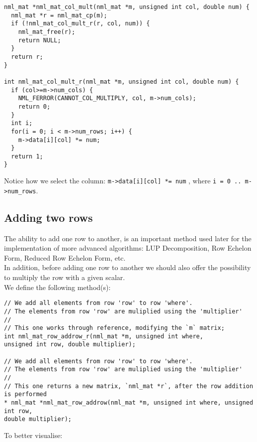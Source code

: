 \begin{verbatim}
nml_mat *nml_mat_col_mult(nml_mat *m, unsigned int col, double num) {
  nml_mat *r = nml_mat_cp(m);
  if (!nml_mat_col_mult_r(r, col, num)) {
    nml_mat_free(r);
    return NULL;
  }
  return r;
}

int nml_mat_col_mult_r(nml_mat *m, unsigned int col, double num) {
  if (col>=m->num_cols) {
    NML_FERROR(CANNOT_COL_MULTIPLY, col, m->num_cols);
    return 0;
  }
  int i;
  for(i = 0; i < m->num_rows; i++) {
    m->data[i][col] *= num;
  }
  return 1;
}
\end{verbatim}

Notice how we select the column: {\tt m->data[i][col] *= num} , where {\tt i = 0 .. m->num\_rows}.

\subsection{Adding two rows}

The ability to add one row to another, is an important method used later for the implementation of more advanced algorithms: LUP Decomposition, Row Echelon Form, Reduced Row Echelon Form, etc.
\\

In addition, before adding one row to another we should also offer the possibility to multiply the row with a given scalar.
\\

We define the following method(s):

\begin{verbatim}
// We add all elements from row 'row' to row 'where'. 
// The elements from row 'row' are muliplied using the 'multiplier'
//
// This one works through reference, modifying the `m` matrix; 
int nml_mat_row_addrow_r(nml_mat *m, unsigned int where, 
unsigned int row, double multiplier);

// We add all elements from row 'row' to row 'where'. 
// The elements from row 'row' are muliplied using the 'multiplier'
//
// This one returns a new matrix, `nml_mat *r`, after the row addition is performed    
* nml_mat *nml_mat_row_addrow(nml_mat *m, unsigned int where, unsigned int row, 
double multiplier);
\end{verbatim}

To better visualise:

